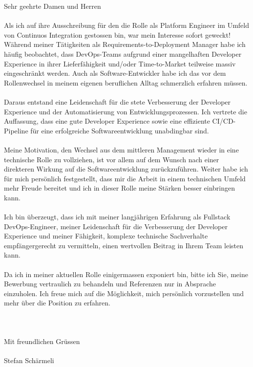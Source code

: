 \documentclass[12pt]{developercv} %
\begin{document}
Sehr geehrte Damen und Herren
\\ \\
Als ich auf ihre Ausschreibung für den die Rolle als Platform Engineer im Umfeld von Continuos Integration gestossen bin, war mein Interesse sofort geweckt! Während meiner Tätigkeiten als Requirements-to-Deployment Manager habe ich häufig beobachtet, dass DevOps-Teams aufgrund einer mangelhaften Developer Experience in ihrer Lieferfähigkeit und/oder Time-to-Market teilweise massiv eingeschränkt werden. Auch als Software-Entwickler habe ich das vor dem Rollenwechsel in meinem eigenen beruflichen Alltag schmerzlich erfahren müssen.
\\ \\
Daraus entstand eine Leidenschaft für die stete Verbesserung der Developer Experience und der Automatisierung von Entwicklungsprozessen. Ich vertrete die Auffassung, dass eine gute Developer Experience sowie eine effiziente CI/CD-Pipeline für eine erfolgreiche Softwareentwicklung unabdingbar sind.
\\ \\
Meine Motivation, den Wechsel aus dem mittleren Management wieder in eine technische Rolle zu vollziehen, ist vor allem auf dem Wunsch nach einer direkteren Wirkung auf die Softwareentwicklung zurückzuführen. Weiter habe ich für mich persönlich festgestellt, dass mir die Arbeit in einem technischen Umfeld mehr Freude bereitet und ich in dieser Rolle meine Stärken besser einbringen kann.
\\ \\
Ich bin überzeugt, dass ich mit meiner langjährigen Erfahrung als Fullstack DevOps-Engineer, meiner Leidenschaft für die Verbesserung der Developer Experience und meiner Fähigkeit, komplexe technische Sachverhalte empfängergerecht zu vermitteln, einen wertvollen Beitrag in Ihrem Team leisten kann.
\\ \\
Da ich in meiner aktuellen Rolle einigermassen exponiert bin, bitte ich Sie, meine Bewerbung vertraulich zu behandeln und Referenzen nur in Absprache einzuholen. Ich freue mich auf die Möglichkeit, mich persönlich vorzustellen und mehr über die Position zu erfahren.
\\ \\
\\ \\
Mit freundlichen Grüssen
\\ \\
Stefan Schärmeli
\end{document}
